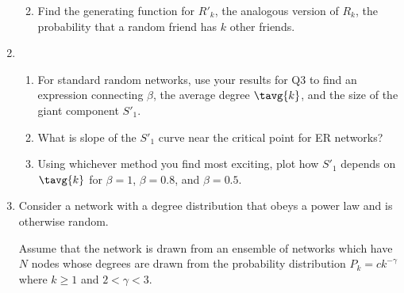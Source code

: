 \begin{enumerate}
\begin{enumerate}
      
   \solutionstart


   \solutionend

    \item
      Find the generating function for $R'_{k}$,
      the analogous version of $R_{k}$, the probability
      that a random friend has $k$ other friends.

      
   \solutionstart


   \solutionend


    \end{enumerate}

  \item 
    \begin{enumerate}

    \item 
      For standard random networks,
      use your results for Q3 to 
      find an expression connecting $\beta$, the average
      degree $\tavg{k}$, and the size of the giant component $S'_{1}$.

      
   \solutionstart


   \solutionend
      

    \item
      What is slope of the $S'_{1}$ curve near the critical
      point for ER networks?

      
   \solutionstart


   \solutionend

    \item
      Using whichever method you find most exciting, plot
      how $S'_{1}$ depends on $\tavg{k}$ for $\beta=1$, $\beta=0.8$,
      and $\beta=0.5$.

      
   \solutionstart


   \solutionend

    \end{enumerate}


  \item

    
    Consider a network with a degree distribution
    that obeys a power law and is otherwise random.
    
    Assume that the network is drawn from
    an ensemble of networks which have $N$ nodes
    whose degrees are drawn from the probability
    distribution
    $P_{k} = c k^{-\gamma}$ where $k \ge 1$ and $2 < \gamma < 3$.


\end{enumerate}
